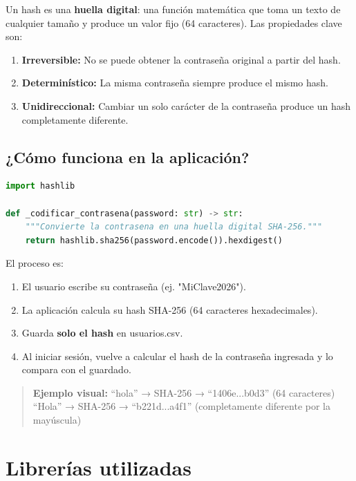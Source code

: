 \documentclass[12pt,a4paper]{article}
\begin{document}
Un hash es una \textbf{huella digital}: una función matemática que toma un texto de cualquier tamaño y produce un valor fijo (64 caracteres). Las propiedades clave son:

\begin{enumerate}
    \item \textbf{Irreversible:} No se puede obtener la contraseña original a partir del hash.
    \item \textbf{Determinístico:} La misma contraseña siempre produce el mismo hash.
    \item \textbf{Unidireccional:} Cambiar un solo carácter de la contraseña produce un hash completamente diferente.
\end{enumerate}

\subsection{¿Cómo funciona en la aplicación?}

\begin{lstlisting}[language=Python, basicstyle=\ttfamily\small]
import hashlib

def _codificar_contrasena(password: str) -> str:
    """Convierte la contrasena en una huella digital SHA-256."""
    return hashlib.sha256(password.encode()).hexdigest()
\end{lstlisting}

El proceso es:
\begin{enumerate}
    \item El usuario escribe su contraseña (ej. "MiClave2026").
    \item La aplicación calcula su hash SHA-256 (64 caracteres hexadecimales).
    \item Guarda \textbf{solo el hash} en usuarios.csv.
    \item Al iniciar sesión, vuelve a calcular el hash de la contraseña ingresada y lo compara con el guardado.
\end{enumerate}

\begin{quote}
\textbf{Ejemplo visual:}
``hola'' → SHA-256 → ``1406e...b0d3'' (64 caracteres)\\
``Hola'' → SHA-256 → ``b221d...a4f1'' (completamente diferente por la mayúscula)
\end{quote}

\section{Librerías utilizadas}
\end{document}
